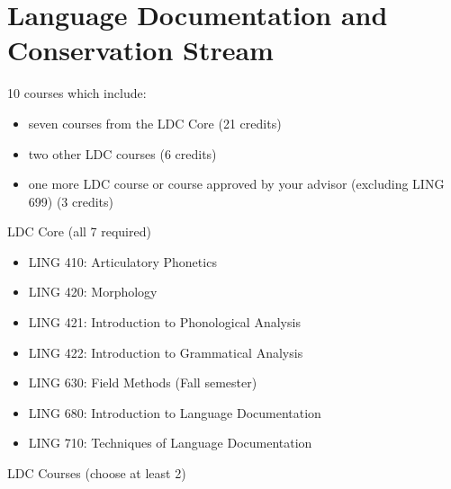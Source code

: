 \documentclass[
]{book}
\providecommand{\tightlist}{%
  \setlength{\itemsep}{0pt}\setlength{\parskip}{0pt}}
\begin{document}
\hypertarget{language-documentation-and-conservation-stream}{%
\section{Language Documentation and Conservation Stream}\label{language-documentation-and-conservation-stream}}

10 courses which include:

\begin{itemize}
\tightlist
\item
  seven courses from the LDC Core (21 credits)
\item
  two other LDC courses (6 credits)
\item
  one more LDC course or course approved by your advisor (excluding LING 699) (3 credits)
\end{itemize}

LDC Core (all 7 required)

\begin{itemize}
\tightlist
\item
  LING 410: Articulatory Phonetics
\item
  LING 420: Morphology
\item
  LING 421: Introduction to Phonological Analysis
\item
  LING 422: Introduction to Grammatical Analysis
\item
  LING 630: Field Methods (Fall semester)
\item
  LING 680: Introduction to Language Documentation
\item
  LING 710: Techniques of Language Documentation
\end{itemize}

LDC Courses (choose at least 2)
\end{document}
